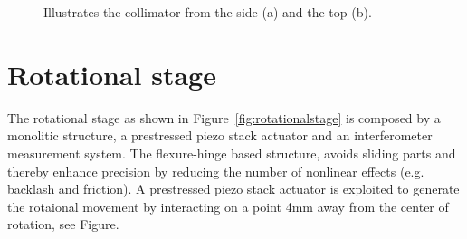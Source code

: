 \begin{figure}[tpb]
  \centering %
  \qquad
  \caption{\label{fig:collimator} Illustrates the collimator from the side (a) and the top (b).}
\end{figure}



\section{Rotational stage}
\label{sec:rotational_stage}
The rotational stage as shown in Figure~\ref{fig:rotationalstage} is composed by a monolitic structure, a prestressed piezo stack actuator and an interferometer measurement system. The flexure-hinge based structure, avoids sliding parts and thereby enhance precision by reducing the number of nonlinear effects (e.g. backlash and friction). A prestressed piezo stack actuator is exploited to generate the rotaional movement by interacting on a point 4mm away from the center of rotation, see Figure.

